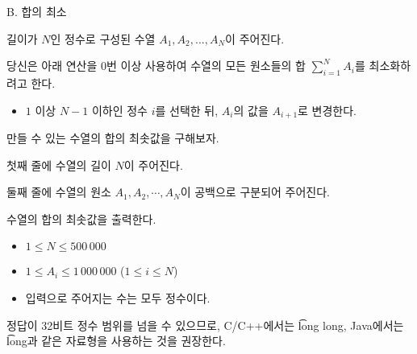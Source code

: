\def\probtitle{합의 최소}
\def\probno{B} %

\begin{problem}{\probno{}. \probtitle{}}

길이가 $N$인 정수로 구성된 수열 $A_1, A_2, ..., A_N$이 주어진다.

당신은 아래 연산을 0번 이상 사용하여 수열의 모든 원소들의 합 $\displaystyle\sum_{i=1}^N A_i$를 최소화하려고 한다.

\begin{itemize}[topsep=0pt,noitemsep]
  \item $1$ 이상 $N-1$ 이하인 정수 $i$를 선택한 뒤, $A_i$의 값을 $A_{i+1}$로 변경한다.
\end{itemize}

만들 수 있는 수열의 합의 최솟값을 구해보자.

\InputFile

첫째 줄에 수열의 길이 $N$이 주어진다.

둘째 줄에 수열의 원소 $A_1, A_2, \cdots, A_N$이 공백으로 구분되어 주어진다.

\OutputFile

수열의 합의 최솟값을 출력한다.

\Constraints

\begin{itemize}[topsep=0pt,noitemsep]
    \item $1 \leq N \leq 500\,000$
    \item $1 \le A_i \le 1\,000\,000$ ($1 \le i \le N$)
    \item 입력으로 주어지는 수는 모두 정수이다.
\end{itemize}

\Example

\begin{example}
\end{example}

\Notes

정답이 32비트 정수 범위를 넘을 수 있으므로, C/C++에서는 \t{long long}, Java에서는 \t{long}과 같은 자료형을 사용하는 것을 권장한다.

\end{problem}